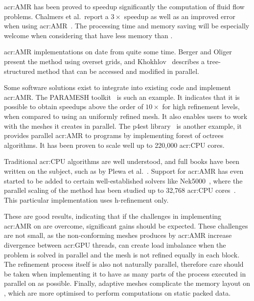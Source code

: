 \Acrshort{acr:AMR} has been proved to speedup significantly the computation of fluid flow problems.
Chalmers et al.\ report a \(3 \times \) speedup as well as an improved error when using
\acrshort{acr:AMR}~\cite{Chalmers2019}. The processing time and memory saving will be especially
welcome when considering that  have less memory than .

\Acrshort{acr:AMR} implementations on  date from quite some time. Berger and
Oliger~\cite{Berger1984} present the method using overset grids, and Khokhlov~\cite{Khokhlov1998}
describes a tree-structured method that can be accessed and modified in parallel.

Some software solutions exist to integrate into existing code and implement \acrlong{acr:AMR}. The
PARAMESH toolkit~\cite{MacNeice2000} is such an example. It indicates that it is possible to obtain
speedups above the order of \( 10 \times \) for high refinement levels, when compared to using an
uniformly refined mesh. It also enables users to work with the meshes it creates in parallel. The
p4est library~\cite{Burstedde2011} is another example, it provides parallel \acrshort{acr:AMR} to
programs by implementing forest of octrees algorithms. It has been proven to scale well up to
220,000 \acrshort{acr:CPU} cores.

Traditional \acrshort{acr:CPU} algorithms are well understood, and full books have been written on
the subject, such as by Plewa et al.~\cite{Plewa2005}. Support for \acrshort{acr:AMR} has even
started to be added to certain well-established solvers like Nek5000~\cite{Offermans2019}, where the
parallel scaling of the method has been studied up to 32,768 \acrshort{acr:CPU}
cores~\cite{Peplinski2016}. This particular implementation uses h-refinement only.

These are good results, indicating that if the challenges in implementing \acrshort{acr:AMR} on
 are overcome, significant gains should be expected. These challenges are not
small, as the non-conforming meshes produces by \acrshort{acr:AMR} increase divergence between
\acrshort{acr:GPU} threads, can create load imbalance when the problem is solved in parallel and the
mesh is not refined equally in each block. The refinement process itself is also not naturally
parallel, therefore care should be taken when implementing it to have as many parts of the process
executed in parallel on  as possible. Finally, adaptive meshes complicate the
memory layout on , which are more optimised to perform computations on static
packed data.

